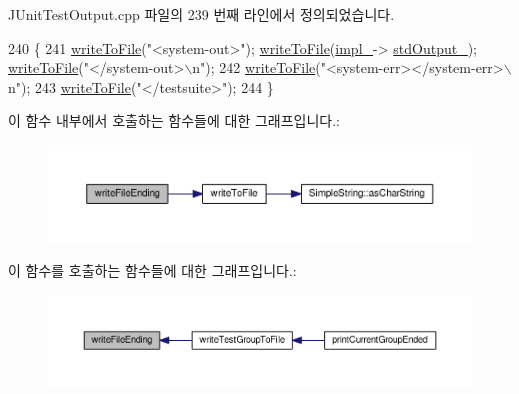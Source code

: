 J\+Unit\+Test\+Output.\+cpp 파일의 239 번째 라인에서 정의되었습니다.


\begin{DoxyCode}
240 \{
241     \hyperlink{class_j_unit_test_output_afddf11a4a5947cd26322aedec8a6dc9a}{writeToFile}(\textcolor{stringliteral}{"<system-out>"}); \hyperlink{class_j_unit_test_output_afddf11a4a5947cd26322aedec8a6dc9a}{writeToFile}(\hyperlink{class_j_unit_test_output_a123a6133cd44cdaa2c63a519f9fb56f4}{impl\_}->
      \hyperlink{struct_j_unit_test_output_impl_acbb0309e620aa28379f1040380eb6378}{stdOutput\_}); \hyperlink{class_j_unit_test_output_afddf11a4a5947cd26322aedec8a6dc9a}{writeToFile}(\textcolor{stringliteral}{"</system-out>\(\backslash\)n"});
242     \hyperlink{class_j_unit_test_output_afddf11a4a5947cd26322aedec8a6dc9a}{writeToFile}(\textcolor{stringliteral}{"<system-err></system-err>\(\backslash\)n"});
243     \hyperlink{class_j_unit_test_output_afddf11a4a5947cd26322aedec8a6dc9a}{writeToFile}(\textcolor{stringliteral}{"</testsuite>"});
244 \}
\end{DoxyCode}


이 함수 내부에서 호출하는 함수들에 대한 그래프입니다.\+:
\nopagebreak
\begin{figure}[H]
\begin{center}
\leavevmode
\includegraphics[width=350pt]{class_j_unit_test_output_a23841fa47868b5c1e915e974f566bbf6_cgraph}
\end{center}
\end{figure}




이 함수를 호출하는 함수들에 대한 그래프입니다.\+:
\nopagebreak
\begin{figure}[H]
\begin{center}
\leavevmode
\includegraphics[width=350pt]{class_j_unit_test_output_a23841fa47868b5c1e915e974f566bbf6_icgraph}
\end{center}
\end{figure}


